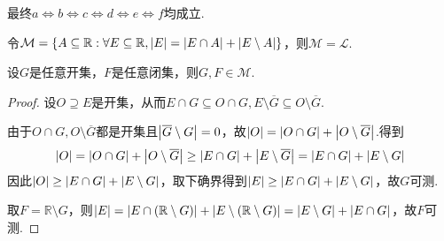 {\kaishu 最终\(a \Leftrightarrow b \Leftrightarrow c \Leftrightarrow d \Leftrightarrow e \Leftrightarrow f\)均成立}.

\newpage

\begin{theorem}\label{2.D.65.1}
    令\(\mathcal{M}=\{A \subseteq \mathbb{R}: \forall E \subseteq \mathbb{R}, \abs*{E}=\abs*{E \cap A}+\abs*{E \setminus A}\}\)，则\(\mathcal{M}=\mathcal{L}\).
\end{theorem}

\begin{lemma}\label{2.D.65.1.1}
    设\(G\)是任意开集，\(F\)是任意闭集，则\(G,F \in \mathcal{M}\).
\end{lemma}

\begin{proof}
    设\(O \supseteq E\)是开集，从而\(E \cap G \subseteq O \cap G, E \setminus \overline{G} \subseteq O \setminus \overline{G}\).
    
    由于\(O \cap G, O \setminus \overline{G}\)都是开集且\(\abs*{\overline{G} \setminus G}=0\)，故\(\abs*{O}=\abs*{O \cap G}+\abs*{O \setminus \overline{G}}\).得到
    \begin{align*}
        \abs*{O}=\abs*{O \cap G}+\abs*{O \setminus \overline{G}} \geq \abs*{E \cap G}+\abs*{E \setminus \overline{G}}=\abs*{E \cap G}+\abs*{E \setminus G}
    \end{align*}
    因此\(\abs*{O} \geq \abs*{E \cap G}+\abs*{E \setminus G}\)，取下确界得到\(\abs*{E} \geq \abs*{E \cap G}+\abs*{E \setminus G}\)，故\(G\)可测.

    取\(F=\mathbb{R} \setminus G\)，则\(\abs*{E}=\abs*{E \cap (\mathbb{R} \setminus G)}+\abs*{E \setminus (\mathbb{R} \setminus G)}=\abs*{E \setminus G}+\abs*{E \cap G}\)，故\(F\)可测.
\end{proof}

